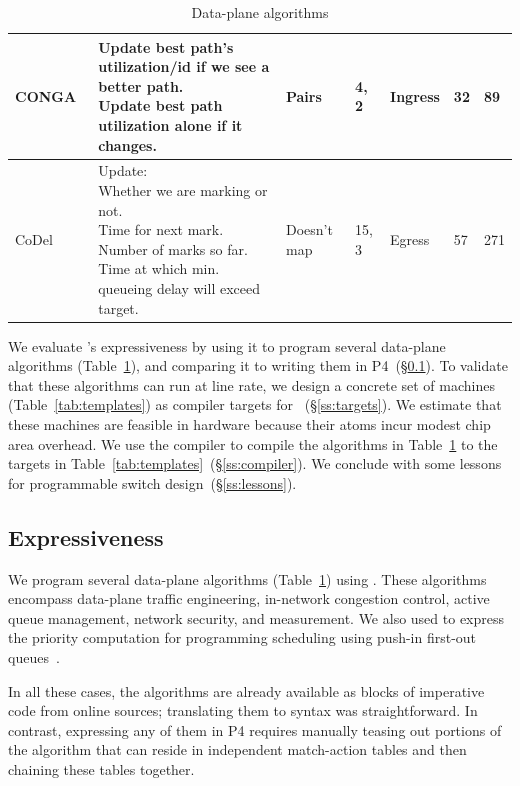 \begin{table}[!t]
\begin{tabular}{|p{}|p{}|p{}|p{}|p{}|p{}|p{}|}
\hline
CONGA~\cite{conga} & \pbox{0.34\textwidth}{Update best path's utilization/id if we see a better path.\\
                                           Update best path utilization alone if it changes.}  & Pairs & 4, 2 & Ingress & 32 & 89\\
\hline
CoDel~\cite{codel} & \pbox{0.34\textwidth}{Update:\\Whether we are marking or not.\\Time for next mark.\\Number of marks so far.\\Time at which min. queueing delay will exceed target.}& Doesn't map & 15, 3 & Egress & 57 & 271\\
\hline
\end{tabular}
\caption{Data-plane algorithms}
\label{tab:algos}
\end{table}

We evaluate \pktlanguage's expressiveness by using it to program several
data-plane algorithms (Table~\ref{tab:algos}), and comparing it to writing them
in P4~(\S\ref{ss:expressiveness}).  To validate that these algorithms can
run at line rate, we design a concrete set of \absmachine machines
(Table~\ref{tab:templates}) as compiler targets for
\pktlanguage~(\S\ref{ss:targets}).  We estimate that these machines are
feasible in hardware because their atoms incur modest chip area overhead.
We use the \pktlanguage compiler to compile the algorithms in
Table~\ref{tab:algos} to the targets in
Table~\ref{tab:templates}~(\S\ref{ss:compiler}).  We conclude with some lessons
for programmable switch design~(\S\ref{ss:lessons}).

\subsection{Expressiveness}
\label{ss:expressiveness}

We program several data-plane
algorithms (Table~\ref{tab:algos}) using \pktlanguage. These algorithms
encompass data-plane traffic engineering, in-network congestion control, active
queue management, network security, and measurement. We also used \pktlanguage
to express the priority computation for programming scheduling using
push-in first-out queues~\cite{pifo_hotnets}.

In all these cases, the algorithms are already available as blocks of
imperative code from online sources; translating them to \pktlanguage syntax
was straightforward. In contrast, expressing any of them in P4 requires
manually teasing out portions of the algorithm that can reside in independent
match-action tables and then chaining these tables together.

